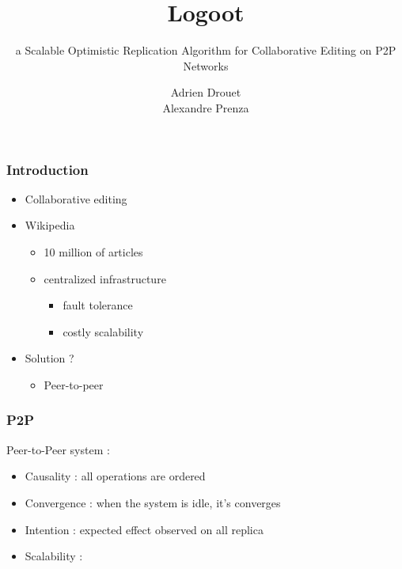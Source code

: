 \documentclass[14pt]{beamer}
\title{Logoot}
\subtitle{a Scalable Optimistic Replication Algorithm for Collaborative Editing on P2P Networks}
\author{Adrien Drouet\\
        Alexandre Prenza}
\begin{document}
  \begin{frame}
    \titlepage
  \end{frame}

	\begin{frame}
		\frametitle{Introduction}
		\begin{itemize}
			\item<1-> Collaborative editing
			\item <2->Wikipedia
				\begin{itemize}
					\item<3-> 10 million of articles
					\item<3-> centralized infrastructure
					\begin{itemize}
						\item<4-> fault tolerance
						\item<4-> costly scalability
					\end{itemize}
				\end{itemize}
			\item<5-> Solution ?
			\begin{itemize}
						\item<6-> Peer-to-peer
			\end{itemize}
		\end{itemize}
	\end{frame}

	\begin{frame}
		\frametitle{P2P}
		Peer-to-Peer system :
		\begin{itemize}
			\item<2-> Causality : all operations are ordered
			\item<2-> Convergence : when the system is idle, it's converges
			\item<2-> Intention : expected effect observed on all replica
			\item<2-> Scalability : 
		\end{itemize}
	\end{frame}
\end{document}
